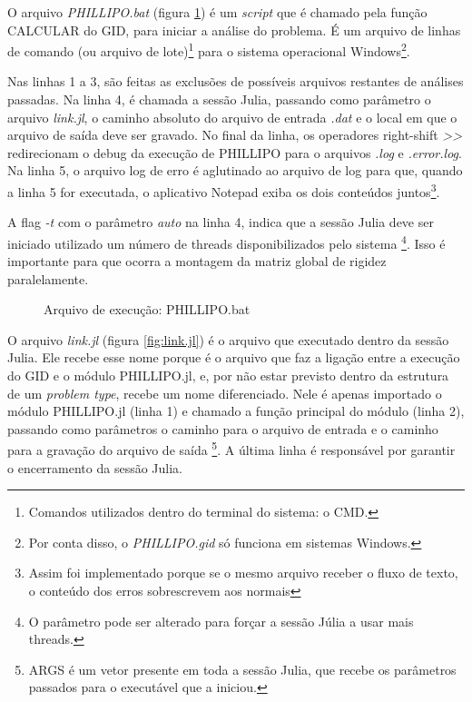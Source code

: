 O arquivo \emph{PHILLIPO.bat} (figura \ref{fig:PHILLIPO.bat}) é um \emph{script} que é chamado pela função CALCULAR do GID, para iniciar a análise do problema. É um arquivo de linhas de comando (ou arquivo de lote)\footnote{Comandos utilizados dentro do terminal do sistema: o CMD.} para o sistema operacional Windows\footnote{Por conta disso, o \emph{PHILLIPO.gid} só funciona em sistemas Windows.}.

Nas linhas 1 a 3, são feitas as exclusões de possíveis arquivos restantes de análises passadas. Na linha 4, é chamada a sessão Julia, passando como parâmetro o arquivo \emph{link.jl}, o caminho absoluto do arquivo de entrada \emph{.dat} e o local em que o arquivo de saída deve ser gravado. No final da linha, os operadores right-shift \emph{>>} redirecionam o debug da execução de PHILLIPO para o arquivos \emph{.log} e \emph{.error.log}. Na linha 5, o arquivo log de erro é aglutinado ao arquivo de log para que, quando a linha 5 for executada, o aplicativo Notepad exiba os dois conteúdos juntos\footnote{Assim foi implementado porque se o mesmo arquivo receber o fluxo de texto, o conteúdo dos erros sobrescrevem aos normais}. 

A flag \emph{-t} com o parâmetro \emph{auto} na linha 4, indica que a sessão Julia deve ser iniciado utilizado um número de threads disponibilizados pelo sistema \footnote{O parâmetro pode ser alterado para forçar a sessão Júlia a usar mais threads.}. Isso é importante para que ocorra a montagem da matriz global de rigidez paralelamente.

\begin{figure}[hbtp]
    \caption{Arquivo de execução: PHILLIPO.bat}
    
    \label{fig:PHILLIPO.bat}
\end{figure}

O arquivo \emph{link.jl} (figura \ref{fig:link.jl}) é o arquivo que executado dentro da sessão Julia. Ele recebe esse nome porque é o arquivo que faz a ligação entre a execução do GID e o módulo PHILLIPO.jl, e, por não estar previsto dentro da estrutura de um \emph{problem type}, recebe um nome diferenciado. Nele é apenas importado o módulo PHILLIPO.jl  (linha 1) e chamado a função principal do módulo (linha 2), passando como parâmetros o caminho para o arquivo de entrada e o caminho para a gravação do arquivo de saída \footnote{ARGS é um vetor presente em toda a sessão Julia, que recebe os parâmetros passados para o executável que a iniciou.}. A última linha é responsável por garantir o encerramento da sessão Julia.

